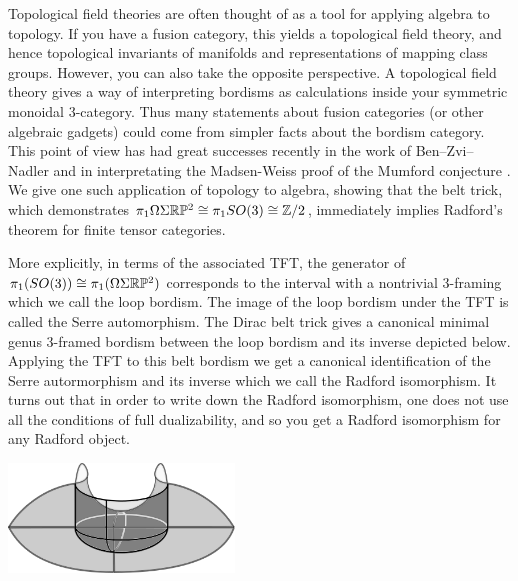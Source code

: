 \documentclass{amsart}
\begin{document}



Topological field theories are often thought of as a tool for applying algebra to topology.  If you have a fusion category, this yields a topological field theory, and hence topological invariants of manifolds and representations of mapping class groups.  However, you can also take the opposite perspective.  A topological field theory gives a way of interpreting bordisms as calculations inside your symmetric monoidal $3$-category.  Thus many statements about fusion categories (or other algebraic gadgets) could come from simpler facts about the bordism category.  This point of view has had great successes recently in the work of Ben--Zvi--Nadler \cite{0904.1247} and in interpretating the Madsen-Weiss proof of the Mumford conjecture \cite{MR2335797, lurie-ch}.  We give one such application of topology to algebra, showing that the belt trick, which demonstrates $\pi_1 \Omega \Sigma \mathbb R \mathbb P^2 \cong \pi_1 SO(3) \cong \mathbb{Z}/2$, immediately implies Radford's theorem for finite tensor categories.







More explicitly, in terms of the associated TFT, the generator of $\pi_1(SO(3)) \cong \pi_1(\Omega \Sigma \mathbb R \mathbb P^2)$ corresponds to the interval with a nontrivial $3$-framing which we call the loop bordism.  The image of the loop bordism under the TFT is called the Serre automorphism.  The Dirac belt trick gives a canonical minimal genus $3$-framed bordism between the loop bordism and its inverse depicted below.  Applying the TFT to this belt bordism we get a canonical identification of the Serre autormorphism and its inverse which we call the Radford isomorphism.  It turns out that in order to write down the Radford isomorphism, one does not use all the conditions of full dualizability, and so you get a Radford isomorphism for any Radford object.  

\begin{center}
\includegraphics[width=60mm]{cobordism.png}
\end{center}
\end{document}
